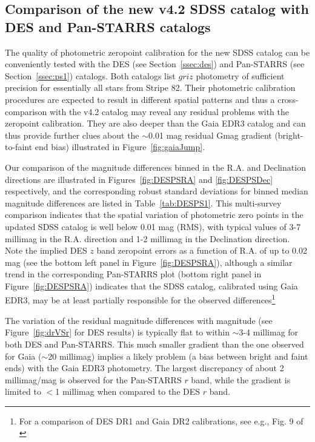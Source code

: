 \documentclass[fleqn,usenatbib]{mnras}
\begin{document}
  

\subsection{Comparison of the new v4.2 SDSS catalog with DES and Pan-STARRS catalogs \label{sec:DESPS1}} 
  
The quality of photometric zeropoint calibration for the new SDSS catalog can be conveniently
tested with the DES (see Section~\ref{ssec:des}) and Pan-STARRS (see Section~\ref{ssec:ps1}) catalogs. 
Both catalogs list $griz$ photometry of sufficient precision for essentially all stars
from Stripe 82. Their photometric calibration procedures are expected to result in different 
spatial patterns and thus a cross-comparison with the v4.2 catalog may reveal any residual problems
with the zeropoint calibration. They are also deeper than the Gaia EDR3 catalog and can thus provide
further clues about the $\sim$0.01 mag residual Gmag gradient (bright-to-faint end bias) 
illustrated in Figure~\ref{fig:gaiaJump}. 

Our comparison of the magnitude differences binned in the R.A. and Declination directions are illustrated in Figures~\ref{fig:DESPSRA} and \ref{fig:DESPSDec} respectively, and the corresponding robust standard deviations for binned median magnitude differences are listed in Table~\ref{tab:DESPS1}. 
This multi-survey comparison indicates that the spatial variation of photometric zero points in the 
updated SDSS catalog is well below 0.01 mag (RMS), with typical values of 3-7 millimag in the R.A. 
direction and 1-2 millimag in the Declination direction. Note the implied DES $z$ band zeropoint errors 
as a function of R.A. of up to 0.02 mag (see the bottom left panel in Figure~\ref{fig:DESPSRA}), although a 
similar trend in the corresponding Pan-STARRS plot (bottom right panel in Figure~\ref{fig:DESPSRA}) indicates 
that the SDSS catalog, calibrated using Gaia EDR3, may be at least partially responsible for the observed 
differences\footnote{For a comparison of DES DR1 and Gaia DR2 calibrations, see e.g., Fig. 9 of \citet{2018ApJS..239...18A}}

The variation of the residual magnitude differences with magnitude (see Figure~\ref{fig:drVSr} for DES results) 
is typically flat to within $\sim$3-4 millimag for both DES and Pan-STARRS. This much smaller gradient than the one observed 
for Gaia ($\sim$20 millimag) implies a likely problem (a bias between bright and faint ends) with the Gaia EDR3 
photometry. The largest discrepancy of about 2 millimag/mag is observed for the Pan-STARRS $r$ band, 
while the gradient is limited to $<$1 millimag when compared to the DES $r$ band. 
   
\end{document}

